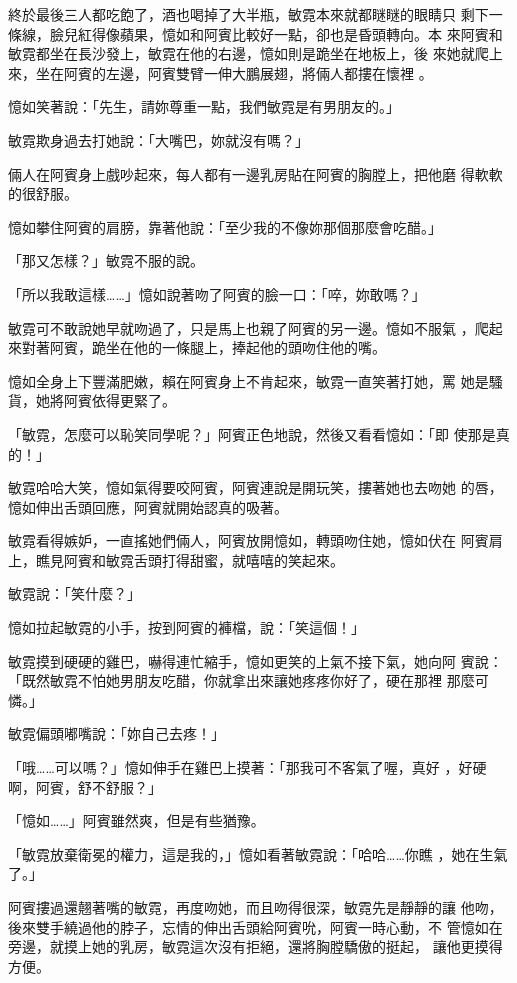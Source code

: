 終於最後三人都吃飽了，酒也喝掉了大半瓶，敏霓本來就都瞇瞇的眼睛只
剩下一條線，臉兒紅得像蘋果，憶如和阿賓比較好一點，卻也是昏頭轉向。本
來阿賓和敏霓都坐在長沙發上，敏霓在他的右邊，憶如則是跪坐在地板上，後
來她就爬上來，坐在阿賓的左邊，阿賓雙臂一伸大鵬展翅，將倆人都摟在懷裡
。

憶如笑著說：「先生，請妳尊重一點，我們敏霓是有男朋友的。」

敏霓欺身過去打她說：「大嘴巴，妳就沒有嗎？」

倆人在阿賓身上戲吵起來，每人都有一邊乳房貼在阿賓的胸膛上，把他磨
得軟軟的很舒服。

憶如攀住阿賓的肩膀，靠著他說：「至少我的不像妳那個那麼會吃醋。」

「那又怎樣？」敏霓不服的說。

「所以我敢這樣……」憶如說著吻了阿賓的臉一口：「啐，妳敢嗎？」

敏霓可不敢說她早就吻過了，只是馬上也親了阿賓的另一邊。憶如不服氣
，爬起來對著阿賓，跪坐在他的一條腿上，捧起他的頭吻住他的嘴。

憶如全身上下豐滿肥嫩，賴在阿賓身上不肯起來，敏霓一直笑著打她，罵
她是騷貨，她將阿賓依得更緊了。

「敏霓，怎麼可以恥笑同學呢？」阿賓正色地說，然後又看看憶如：「即
使那是真的！」

敏霓哈哈大笑，憶如氣得要咬阿賓，阿賓連說是開玩笑，摟著她也去吻她
的唇，憶如伸出舌頭回應，阿賓就開始認真的吸著。

敏霓看得嫉妒，一直搖她們倆人，阿賓放開憶如，轉頭吻住她，憶如伏在
阿賓肩上，瞧見阿賓和敏霓舌頭打得甜蜜，就嘻嘻的笑起來。

敏霓說：「笑什麼？」

憶如拉起敏霓的小手，按到阿賓的褲檔，說：「笑這個！」

敏霓摸到硬硬的雞巴，嚇得連忙縮手，憶如更笑的上氣不接下氣，她向阿
賓說：「既然敏霓不怕她男朋友吃醋，你就拿出來讓她疼疼你好了，硬在那裡
那麼可憐。」

敏霓偏頭嘟嘴說：「妳自己去疼！」

「哦……可以嗎？」憶如伸手在雞巴上摸著：「那我可不客氣了喔，真好
，好硬啊，阿賓，舒不舒服？」

「憶如……」阿賓雖然爽，但是有些猶豫。

「敏霓放棄衛冕的權力，這是我的，」憶如看著敏霓說：「哈哈……你瞧
，她在生氣了。」

阿賓摟過還翹著嘴的敏霓，再度吻她，而且吻得很深，敏霓先是靜靜的讓
他吻，後來雙手繞過他的脖子，忘情的伸出舌頭給阿賓吮，阿賓一時心動，不
管憶如在旁邊，就摸上她的乳房，敏霓這次沒有拒絕，還將胸膛驕傲的挺起，
讓他更摸得方便。

